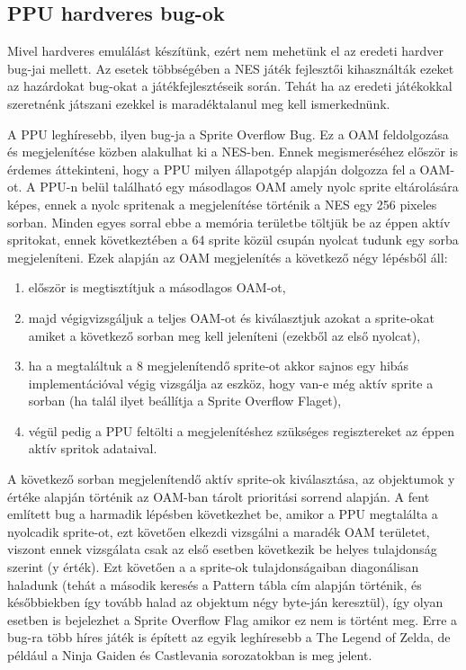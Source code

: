  	 \subsection{PPU hardveres bug-ok}
 	 Mivel hardveres emulálást készítünk, ezért nem mehetünk el az eredeti hardver bug-jai mellett. Az esetek többségében a NES játék fejlesztői kihasználták ezeket az hazárdokat bug-okat a játékfejlesztéseik során. Tehát ha az eredeti játékokkal szeretnénk játszani ezekkel is maradéktalanul meg kell ismerkednünk.
 	 
 	 A PPU leghíresebb, ilyen bug-ja a Sprite Overflow Bug. Ez a OAM feldolgozása és megjelenítése közben alakulhat ki a NES-ben. Ennek megismeréséhez először is érdemes áttekinteni, hogy a PPU milyen állapotgép alapján dolgozza fel a OAM-ot. A PPU-n belül található egy másodlagos OAM amely nyolc sprite eltárolására képes, ennek a nyolc spritenak a megjelenítése történik a NES egy 256 pixeles sorban. Minden egyes sorral ebbe a memória területbe töltjük be az éppen aktív spritokat, ennek következtében a 64 sprite közül csupán nyolcat tudunk egy sorba megjeleníteni. Ezek alapján az OAM megjelenítés a következő négy lépésből áll:
 	  
 	 \begin{enumerate}
 	 	\item először is megtisztítjuk a másodlagos OAM-ot,
 	 	\item majd végigvizsgáljuk a teljes OAM-ot és kiválasztjuk azokat a sprite-okat amiket a következő sorban meg kell jeleníteni (ezekből az első nyolcat),
 	 	\item ha a megtaláltuk a 8 megjelenítendő sprite-ot akkor sajnos egy hibás implementációval végig vizsgálja az eszköz, hogy van-e még aktív sprite a sorban (ha talál ilyet beállítja a Sprite Overflow Flaget),
 	 	\item végül pedig a PPU feltölti a megjelenítéshez szükséges regisztereket az éppen aktív spritok adataival.
 	 \end{enumerate}
 	 
 	 A következő sorban megjelenítendő aktív sprite-ok kiválasztása, az objektumok y értéke alapján történik az OAM-ban tárolt prioritási sorrend alapján. A fent említett bug a harmadik lépésben következhet be, amikor a PPU megtalálta a nyolcadik sprite-ot, ezt követően elkezdi vizsgálni a maradék OAM területet, viszont ennek vizsgálata csak az első esetben következik be helyes tulajdonság szerint (y érték). Ezt követően a a sprite-ok tulajdonságaiban diagonálisan haladunk (tehát a második keresés a Pattern tábla cím alapján történik, és későbbiekben így tovább halad az objektum négy byte-ján keresztül), így olyan esetben is bejelezhet a Sprite Overflow Flag amikor ez nem is történt meg. Erre a bug-ra több híres játék is épített az egyik leghíresebb a The Legend of Zelda, de például a Ninja Gaiden és Castlevania sorozatokban is meg jelent.
 	 
